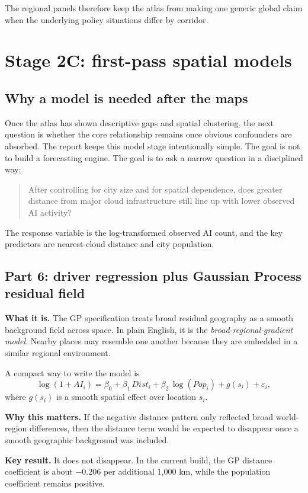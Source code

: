 \documentclass[11pt]{article}
\begin{document}
The regional panels therefore keep the atlas from making one generic global claim when the underlying policy situations differ by corridor.

\section{Stage 2C: first-pass spatial models}

\subsection{Why a model is needed after the maps}
Once the atlas has shown descriptive gaps and spatial clustering, the next question is whether the core relationship remains once obvious confounders are absorbed. The report keeps this model stage intentionally simple. The goal is not to build a forecasting engine. The goal is to ask a narrow question in a disciplined way:

\begin{quote}
After controlling for city size and for spatial dependence, does greater distance from major cloud infrastructure still line up with lower observed AI activity?
\end{quote}

The response variable is the log-transformed observed AI count, and the key predictors are nearest-cloud distance and city population.

\subsection{Part 6: driver regression plus Gaussian Process residual field}
\textbf{What it is.} The GP specification treats broad residual geography as a smooth background field across space. In plain English, it is the \emph{broad-regional-gradient model}. Nearby places may resemble one another because they are embedded in a similar regional environment.

A compact way to write the model is
\[
\log(1 + AI_i) = \beta_0 + \beta_1\,Dist_i + \beta_2\,\log(Pop_i) + g(s_i) + \varepsilon_i,
\]
where $g(s_i)$ is a smooth spatial effect over location $s_i$.

\textbf{Why this matters.} If the negative distance pattern only reflected broad world-region differences, then the distance term would be expected to disappear once a smooth geographic background was included.

\textbf{Key result.} It does not disappear. In the current build, the GP distance coefficient is about $-0.206$ per additional 1{,}000 km, while the population coefficient remains positive.
\end{document}
